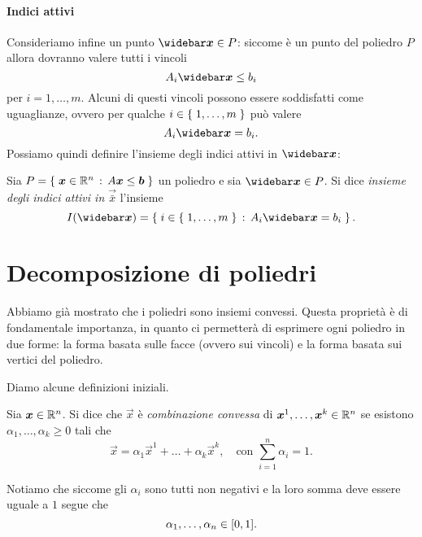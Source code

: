 \paragraph{Indici attivi} Consideriamo infine un punto $\vecbar{x} \in P$: siccome è un punto del poliedro $P$ allora dovranno valere tutti i vincoli 
\[
    A_i\vecbar{x} \leq b_i    
\] per $i = 1, \dots, m$. Alcuni di questi vincoli possono essere soddisfatti come uguaglianze, ovvero per qualche $i \in \left\{\;1, \dots, m\;\right\}$ può valere \[
    A_i\vecbar{x} = b_i.    
\] Possiamo quindi definire l'insieme degli indici attivi in $\vecbar{x}$:

\begin{definition}
    Sia $P = \left\{\;\bm{x} \in \mathbb{R}^n \,:\, A\bm{x} \leq \bm{b}\;\right\}$ un poliedro e sia $\vecbar{x} \in P$. Si dice \emph{insieme degli indici attivi in $\vec{\bar{x}}$} l'insieme \begin{equation}
        I(\vecbar{x}) = \set{i \in \set{1, \dots, m} \suchthat A_i\vecbar{x} = b_i}.
    \end{equation}
\end{definition}

\section{Decomposizione di poliedri}

Abbiamo già mostrato che i poliedri sono insiemi convessi. Questa proprietà è di fondamentale importanza, in quanto ci permetterà di esprimere ogni poliedro in due forme: la forma basata sulle facce (ovvero sui vincoli) e la forma basata sui vertici del poliedro.

Diamo alcune definizioni iniziali.
\begin{definition}
    Sia $\bm{x} \in \mathbb{R}^n$. Si dice che $\vec x$ è \emph{combinazione convessa} di $\bm{x}^1, \dots, \bm{x}^k \in \mathbb{R}^n$ se esistono $\alpha_1, \dots, \alpha_k \geq 0$ tali che \begin{equation}
        \vec x = \alpha_1\vec x^1 + \dots + \alpha_k\vec x^k, \quad \text{con } \sum_{i = 1}^n \alpha_i = 1.
    \end{equation}
\end{definition}

Notiamo che siccome gli $\alpha_i$ sono tutti non negativi e la loro somma deve essere uguale a $1$ segue che \[
    \alpha_1, \dots, \alpha_n \in \closedInt*{0, 1}.    
\]

